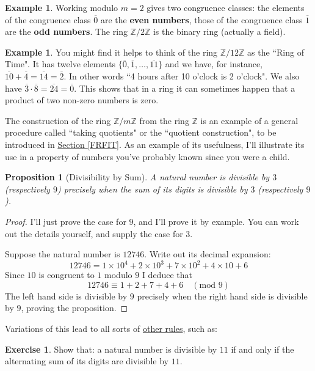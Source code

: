 \documentclass[11pt]{amsbook}
\newtheorem{proposition}[theorem]{Proposition}
\theoremstyle{definition}
\newtheorem{ex}[theorem]{Example}
\newtheorem{exercise}{Exercise}
\begin{document}
\begin{ex}
Working modulo $m=2$ gives two congruence classes: the elements of the congruence class $\overline{0}$ are the {\bf even numbers}, those of the congruence class $\overline{1}$ are the {\bf odd numbers}. The ring $\mathbb{Z}/2\mathbb{Z}$ is the binary ring (actually a field).
\end{ex}

\begin{ex} You might find it helps to think of the ring $\mathbb{Z}/12 \mathbb{Z}$ as the ``Ring of Time". It has twelve elements $\{ \overline{0}, \overline{1}, \ldots , \overline{11}\}$ and we have, for instance, $\overline{10} + \overline{4} = \overline{14} = \overline{2}$. In other words ``4 hours after 10 o'clock is 2 o'clock". We also have $\overline{3}\cdot \overline{8} = \overline{24} = \overline{0}$. This shows that in a ring it can sometimes happen that a product of two non-zero numbers is zero.
\end{ex}

The construction of the ring $\mathbb{Z}/m\mathbb{Z}$ from the ring $\mathbb{Z}$ is an example of a general procedure called ``taking quotients" or the ``quotient construction", to be introduced in \hyperref[FRFIT]{Section \ref{FRFIT}}. As an example of its usefulness, I'll illustrate its use in a property of numbers you've probably known since you were a child.

\begin{proposition}[Divisibility by Sum] A natural number is divisible by $3$ (respectively $9$) precisely when the sum of its digits is divisible by $3$ (respectively $9$).
\end{proposition}

\begin{proof} I'll just prove the case for $9$, and I'll prove it by example. You can work out the details yourself, and supply the case for $3$.

Suppose the natural number is $12746$. Write out its decimal expansion:
$$12746 = 1\times 10^4 + 2\times 10^3 + 7\times 10^2 + 4\times 10 + 6$$ Since $10$ is congruent to $1$ modulo $9$ I deduce that
$$12746 \equiv 1+ 2+ 7 + 4 + 6 \quad (\text{mod }9)$$
The left hand side is divisible by $9$ precisely when the right hand side is divisible by $9$, proving the proposition.
\end{proof}
	
Variations of this lead to all sorts of \href{http://en.wikipedia.org/wiki/Divisibility_rule}{other rules}, such as:
\begin{exercise}
Show that: a natural number is divisible by $11$ if and only if the alternating sum of its digits are divisible by $11$.
\end{exercise}
\end{document}
